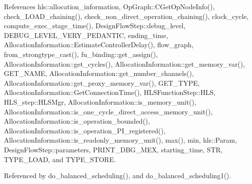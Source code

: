 References hls\+::allocation\+\_\+information, Op\+Graph\+::\+C\+Get\+Op\+Node\+Info(), check\+\_\+\+L\+O\+A\+D\+\_\+chaining(), check\+\_\+non\+\_\+direct\+\_\+operation\+\_\+chaining(), clock\+\_\+cycle, compute\+\_\+exec\+\_\+stage\+\_\+time(), Design\+Flow\+Step\+::debug\+\_\+level, D\+E\+B\+U\+G\+\_\+\+L\+E\+V\+E\+L\+\_\+\+V\+E\+R\+Y\+\_\+\+P\+E\+D\+A\+N\+T\+IC, ending\+\_\+time, Allocation\+Information\+::\+Estimate\+Controller\+Delay(), flow\+\_\+graph, from\+\_\+strongtype\+\_\+cast(), fu\+\_\+binding\+::get\+\_\+assign(), Allocation\+Information\+::get\+\_\+cycles(), Allocation\+Information\+::get\+\_\+memory\+\_\+var(), G\+E\+T\+\_\+\+N\+A\+ME, Allocation\+Information\+::get\+\_\+number\+\_\+channels(), Allocation\+Information\+::get\+\_\+proxy\+\_\+memory\+\_\+var(), G\+E\+T\+\_\+\+T\+Y\+PE, Allocation\+Information\+::\+Get\+Connection\+Time(), H\+L\+S\+Function\+Step\+::\+H\+LS, H\+L\+S\+\_\+step\+::\+H\+L\+S\+Mgr, Allocation\+Information\+::is\+\_\+memory\+\_\+unit(), Allocation\+Information\+::is\+\_\+one\+\_\+cycle\+\_\+direct\+\_\+access\+\_\+memory\+\_\+unit(), Allocation\+Information\+::is\+\_\+operation\+\_\+bounded(), Allocation\+Information\+::is\+\_\+operation\+\_\+\+P\+I\+\_\+registered(), Allocation\+Information\+::is\+\_\+readonly\+\_\+memory\+\_\+unit(), max(), min, hls\+::\+Param, Design\+Flow\+Step\+::parameters, P\+R\+I\+N\+T\+\_\+\+D\+B\+G\+\_\+\+M\+EX, starting\+\_\+time, S\+TR, T\+Y\+P\+E\+\_\+\+L\+O\+AD, and T\+Y\+P\+E\+\_\+\+S\+T\+O\+RE.



Referenced by do\+\_\+balanced\+\_\+scheduling(), and do\+\_\+balanced\+\_\+scheduling1().

